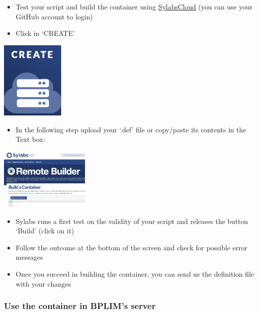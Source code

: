 \documentclass[
  11pt,
  a4paper,
]{article}
\providecommand{\tightlist}{%
  \setlength{\itemsep}{0pt}\setlength{\parskip}{0pt}}
\begin{document}
\begin{itemize}
\item
  Test your script and build the container using
  \href{https://cloud.sylabs.io/}{SylabsCloud} (you can use your GitHub
  account to login)
\item
  Click in `CREATE'
\end{itemize}

\includegraphics[width=1.2in,height=\textheight]{media/SylabsCreate.png}

\begin{itemize}
\tightlist
\item
  In the following step upload your `.def' file or copy/paste its
  contents in the Text box:
\end{itemize}

\includegraphics[width=1.7in,height=\textheight]{media/SylabsBuildContainer.png}

\begin{itemize}
\item
  Sylabs runs a first test on the validity of your script and releases
  the button `Build' (click on it)
\item
  Follow the outcome at the bottom of the screen and check for possible
  error messages
\item
  Once you succeed in building the container, you can send us the
  definition file with your changes
\end{itemize}

\hypertarget{use-the-container-in-bplims-server}{%
\subsubsection{Use the container in BPLIM's
server}\label{use-the-container-in-bplims-server}}
\end{document}
